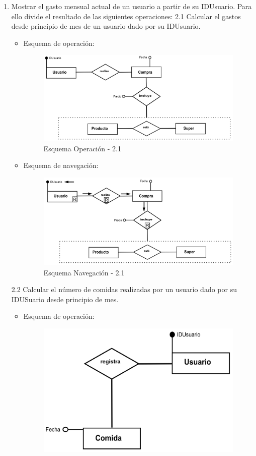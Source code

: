 \documentclass[a4paper,12pt]{report}
\begin{document}
\begin{enumerate}
\item Mostrar el gasto mensual actual de un usuario a partir de su
IDUsuario. Para ello divide el resultado de las siguientes operaciones:
2.1 Calcular el gastos desde principio de mes de un usuario dado por su IDUsuario.
\begin{itemize}
\item Esquema de operación:
\begin{figure}[!htp]
\centering
\includegraphics[width=0.9\linewidth]{./operaciones/img/Estadisticas/21_ope.png}
\caption{Esquema Operación - 2.1}
\label{fig:ope21}
\medskip
\footnotesize
{}
\end{figure}
\item Esquema de navegación:
\begin{figure}[!htp]
\centering
\includegraphics[width=0.9\linewidth]{./operaciones/img/Estadisticas/21_nav.png}
\caption{Esquema Navegación - 2.1}
\label{fig:nave21}
\medskip
\footnotesize
{}
\end{figure}
\end{itemize}
2.2 Calcular el número de comidas realizadas por un usuario dado por su IDUSuario desde principio de mes.
\begin{itemize}
\item Esquema de operación:
\begin{figure}[!htp]
\centering
\includegraphics[width=0.9\linewidth]{./operaciones/img/Estadisticas/22_ope.png}

\end{figure}
\end{itemize}
\end{enumerate}
\end{document}
